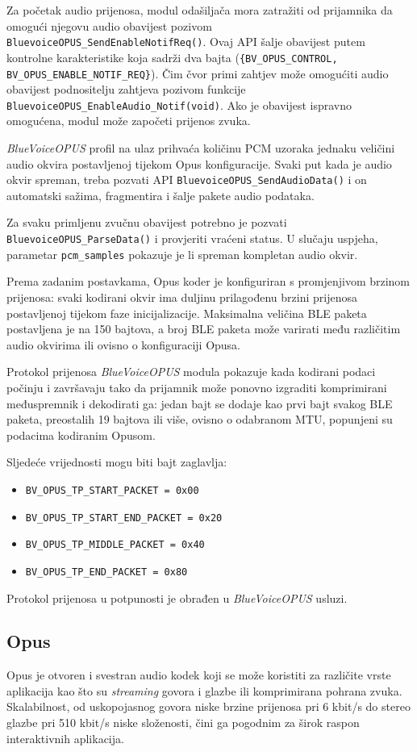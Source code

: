 Za početak audio prijenosa, modul odašiljača mora zatražiti od prijamnika da omogući njegovu audio obavijest pozivom \lstinline|BluevoiceOPUS_SendEnableNotifReq()|. Ovaj API šalje obavijest putem kontrolne karakteristike koja sadrži dva bajta (\lstinline|{BV_OPUS_CONTROL, BV_OPUS_ENABLE_NOTIF_REQ}|). Čim čvor primi zahtjev može omogućiti audio obavijest podnositelju zahtjeva pozivom funkcije \lstinline|BluevoiceOPUS_EnableAudio_Notif(void)|. Ako je obavijest ispravno omogućena, modul može započeti prijenos zvuka.

\textit{BlueVoiceOPUS} profil na ulaz prihvaća količinu PCM uzoraka jednaku veličini audio okvira postavljenoj tijekom Opus konfiguracije. Svaki put kada je audio okvir spreman, treba pozvati API \lstinline|BluevoiceOPUS_SendAudioData()| i on automatski sažima, fragmentira i šalje pakete audio podataka.

Za svaku primljenu zvučnu obavijest potrebno je pozvati \lstinline|BluevoiceOPUS_ParseData()| i provjeriti vraćeni status. U slučaju uspjeha, parametar \lstinline|pcm_samples| pokazuje je li spreman kompletan audio okvir.

Prema zadanim postavkama, Opus koder je konfiguriran s promjenjivom brzinom prijenosa: svaki kodirani okvir ima  duljinu prilagođenu brzini prijenosa postavljenoj tijekom faze inicijalizacije. Maksimalna veličina BLE paketa postavljena je na 150 bajtova, a broj BLE paketa može varirati među različitim audio okvirima ili ovisno o konfiguraciji Opusa.

Protokol prijenosa \textit{BlueVoiceOPUS} modula pokazuje kada kodirani podaci počinju i završavaju tako da prijamnik može ponovno izgraditi komprimirani međuspremnik i dekodirati ga: jedan bajt se dodaje kao prvi bajt svakog BLE paketa, preostalih 19 bajtova ili više, ovisno o odabranom MTU, popunjeni su podacima kodiranim Opusom.

Sljedeće vrijednosti mogu biti bajt zaglavlja:
\begin{itemize}
	\item \lstinline|BV_OPUS_TP_START_PACKET = 0x00|
	\item \lstinline|BV_OPUS_TP_START_END_PACKET = 0x20|
	\item \lstinline|BV_OPUS_TP_MIDDLE_PACKET = 0x40|
	\item \lstinline|BV_OPUS_TP_END_PACKET = 0x80|
\end{itemize}

Protokol prijenosa u potpunosti je obrađen u \textit{BlueVoiceOPUS} usluzi.
\subsection{Opus}
Opus je otvoren i svestran audio kodek koji se može koristiti za različite vrste aplikacija kao što su \textit{streaming} govora i glazbe ili komprimirana pohrana zvuka. Skalabilnost, od uskopojasnog govora niske brzine prijenosa pri 6 kbit/s do stereo glazbe pri 510 kbit/s niske složenosti, čini ga pogodnim za širok raspon interaktivnih aplikacija.

